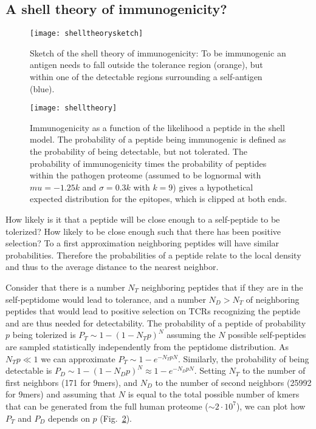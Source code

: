 \documentclass[superscriptaddress,twocolumn,pre]{revtex4}
\newcommand{\<}{\langle}
\renewcommand{\>}{\rangle}
\begin{document}


\subsection{A shell theory of immunogenicity?}

\begin{figure}
    \texttt{[image: shelltheorysketch]}
    \caption{Sketch of the shell theory of immunogenicity: To be immunogenic an antigen needs to fall outside the tolerance region (orange), but within one of the detectable regions surrounding a self-antigen (blue).
    \label{figshelltheorysketch}
    }
\end{figure}

\begin{figure}
    \texttt{[image: shelltheory]}
    \caption{Immunogenicity as a function of the likelihood a peptide in the shell model. The probability of a peptide being immunogenic is defined as the probability of being detectable, but not tolerated. The probability of immunogenicity times the probability of peptides within the pathogen proteome (assumed to be lognormal with $mu = -1.25 k$ and $\sigma = 0.3 k$ with $k=9$) gives a hypothetical expected distribution for the epitopes, which is clipped at both ends.  
    \label{figshelltheory}
    }
\end{figure}

How likely is it that a peptide will be close enough to a self-peptide to be tolerized? How likely to be close enough such that there has been positive selection? To a first approximation neighboring peptides will have similar probabilities. Therefore the probabilities of a peptide relate to the local density and thus to the average distance to the nearest neighbor.

Consider that there is a number $N_T$ neighboring peptides that if they are in the self-peptidome would lead to tolerance, and a number $N_D > N_T$ of neighboring peptides that would lead to positive selection on TCRs recognizing the peptide and are thus needed for detectability. The probability of a peptide of probability $p$ being tolerized is $P_T \sim 1-(1-N_T p)^N$ assuming the $N$ possible self-peptides are sampled statistically independently from the peptidome distribution. As $N_T p \ll 1$ we can approximate $P_T \sim 1-e^{-N_T p N}$. Similarly, the probability of being detectable is $P_D \sim 1-(1-N_D p)^N \approx 1-e^{-N_D p N}$. Setting $N_T$ to the number of first neighbors (171 for 9mers), and $N_D$ to the number of second neighbors (25992 for 9mers) and assuming that $N$ is equal to the total possible number of kmers that can be generated from the full human proteome ($\sim 2 \cdot 10^7$), we can plot how $P_T$ and $P_D$ depends on $p$ (Fig.~\ref{figshelltheory}).
\end{document}
